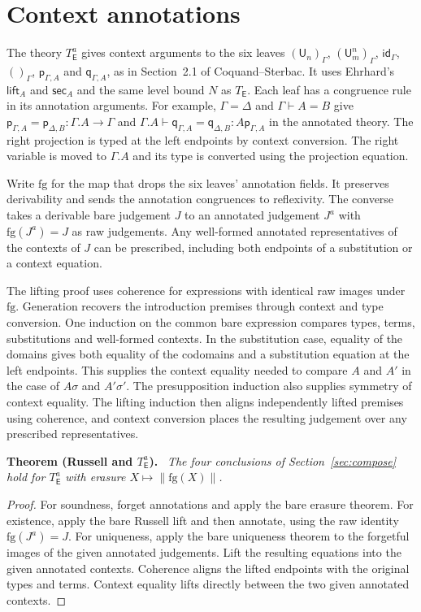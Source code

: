 \documentclass[11pt]{article}
\newenvironment{theorem}[1]{\par\medskip\noindent\textbf{Theorem #1.}\ \itshape}{\par\medskip}
\theoremstyle{definition}
\theoremstyle{remark}
\newcommand{\U}{\mathsf U}
\newcommand{\p}{\mathsf p}
\newcommand{\q}{\mathsf q}
\newcommand{\id}{\mathsf{id}}
\newcommand{\lift}{\mathsf{lift}}
\newcommand{\sect}{\mathsf{sec}}
\begin{document}
\section{Context annotations}\label{sec:annot}

The theory $T_{\mathsf E}^{a}$ gives context arguments to the six leaves
$(\U_n)_\Gamma$, $(\U^n_m)_\Gamma$, $\id_\Gamma$, $()_\Gamma$,
$\p_{\Gamma,A}$ and $\q_{\Gamma,A}$, as in Section~2.1 of
Coquand--Sterbac. It uses Ehrhard's $\lift_A$ and $\sect_A$ and the same
level bound $N$ as $T_{\mathsf E}$. Each leaf has a congruence rule in its
annotation arguments. For example, $\Gamma=\Delta$ and $\Gamma\vdash A=B$
give $\p_{\Gamma,A}=\p_{\Delta,B}:\Gamma.A\to\Gamma$ and
$\Gamma.A\vdash\q_{\Gamma,A}=\q_{\Delta,B}:A\p_{\Gamma,A}$ in the
annotated theory. The right projection is typed at the left endpoints
by context conversion. The right variable is moved to $\Gamma.A$
and its type is converted using the projection equation.

Write $\mathrm{fg}$ for the map that drops the six leaves' annotation
fields. It preserves derivability and sends the annotation congruences
to reflexivity. The converse takes a derivable bare judgement $J$ to an
annotated judgement $J^a$ with $\mathrm{fg}(J^a)=J$ as raw judgements.
Any well-formed annotated representatives of the contexts of $J$ can
be prescribed, including both endpoints of a substitution or a
context equation.

The lifting proof uses coherence for expressions with identical raw
images under $\mathrm{fg}$. Generation recovers the introduction premises
through context and type conversion. One induction on the common bare
expression compares types, terms, substitutions and well-formed
contexts. In the substitution case, equality of the domains gives both
equality of the codomains and a substitution equation at the left
endpoints. This supplies the context equality needed to compare $A$ and
$A'$ in the case of $A\sigma$ and $A'\sigma'$. The presupposition
induction also supplies symmetry of context equality. The lifting
induction then aligns independently lifted premises using coherence,
and context conversion places the resulting judgement over any
prescribed representatives.

\begin{theorem}{(Russell and $T_{\mathsf E}^{a}$)}
The four conclusions of Section~\ref{sec:compose} hold for
$T_{\mathsf E}^{a}$ with erasure \mbox{$X\mapsto\|\mathrm{fg}(X)\|$}.
\end{theorem}
\begin{proof}
For soundness, forget annotations and apply the bare erasure theorem.
For existence, apply the bare Russell lift and then annotate, using the
raw identity $\mathrm{fg}(J^a)=J$. For uniqueness, apply the bare
uniqueness theorem to the forgetful images of the given annotated
judgements. Lift the resulting equations into the given annotated
contexts. Coherence aligns the lifted endpoints with the original
types and terms. Context equality lifts directly between the two
given annotated contexts.
\end{proof}
\end{document}
